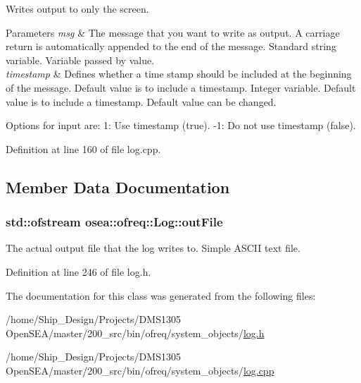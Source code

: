 Writes output to only the screen. 


\begin{DoxyParams}{Parameters}
{\em msg} & The message that you want to write as output. A carriage return is automatically appended to the end of the message. Standard string variable. Variable passed by value. \\
\hline
{\em timestamp} & Defines whether a time stamp should be included at the beginning of the message. Default value is to include a timestamp. Integer variable. Default value is to include a timestamp. Default value can be changed.\\
\hline
\end{DoxyParams}
Options for input are\-: 1\-: Use timestamp (true). -\/1\-: Do not use timestamp (false). 

Definition at line 160 of file log.\-cpp.



\subsection{Member Data Documentation}
\hypertarget{classosea_1_1ofreq_1_1_log_a1d01f650789c18476389cba175b0b702}{
\subsubsection[{out\-File}]{\setlength{\rightskip}{0pt plus 5cm}std\-::ofstream osea\-::ofreq\-::\-Log\-::out\-File}}\label{classosea_1_1ofreq_1_1_log_a1d01f650789c18476389cba175b0b702}


The actual output file that the log writes to. Simple A\-S\-C\-I\-I text file. 



Definition at line 246 of file log.\-h.



The documentation for this class was generated from the following files\-:\begin{DoxyCompactItemize}
\item 
/home/\-Ship\-\_\-\-Design/\-Projects/\-D\-M\-S1305 Open\-S\-E\-A/master/200\-\_\-src/bin/ofreq/system\-\_\-objects/\hyperlink{log_8h}{log.\-h}\item 
/home/\-Ship\-\_\-\-Design/\-Projects/\-D\-M\-S1305 Open\-S\-E\-A/master/200\-\_\-src/bin/ofreq/system\-\_\-objects/\hyperlink{log_8cpp}{log.\-cpp}\end{DoxyCompactItemize}
